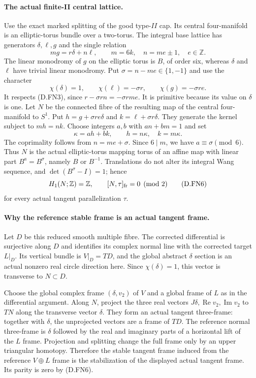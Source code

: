 \paragraph{The actual finite-II central lattice.}
Use the exact marked splitting of the good type-$II$ cap.
Its central four-manifold is an elliptic-torus bundle over a
two-torus.  The integral base lattice has generators
$\delta,\ell,g$ and the single relation
\[
                      m g=r\delta+n\ell,\qquad
                 m=6k,\quad n=me\pm1,\quad e\in\mathbb Z.
 \tag{D.FN3}
\]
The linear monodromy of $g$ on the elliptic torus is $B$, of
order six, whereas $\delta$ and $\ell$ have trivial linear
monodromy.  Put $\sigma=n-me\in\{1,-1\}$ and use the character
\[
 \chi(\delta)=1,\qquad
 \chi(\ell)=-\sigma r,\qquad \chi(g)=-\sigma re.
 \tag{D.FN4}
\]
It respects (D.FN3), since
$r-\sigma rn=-\sigma rme$.  It is primitive because its value
on $\delta$ is one.  Let $N$ be the connected fibre of the
resulting map of the central four-manifold to $S^1$.
Put $h=g+\sigma re\delta$ and $k=\ell+\sigma r\delta$.
They generate the kernel subject to $mh=nk$.  Choose integers
$a,b$ with $an+bm=1$ and set
\[
              \kappa=ah+bk,\qquad h=n\kappa,\quad k=m\kappa.
 \tag{D.FN5}
\]
The coprimality follows from $n=me+\sigma$.  Since $6\mid m$,
we have $a\equiv\sigma\pmod6$.  Thus $N$ is the actual
elliptic-torus mapping torus of an affine map with linear part
$B^a=B^\sigma$, namely $B$ or $B^{-1}$.
Translations do not alter its integral Wang sequence, and
$\det(B^\sigma-I)=1$; hence
\[
                    H_1(N;\mathbb Z)=\mathbb Z,
                    \qquad [N,\tau]_{\rm fr}=0\pmod2
 \tag{D.FN6}
\]
for every actual tangent parallelization $\tau$.

\paragraph{Why the reference stable frame is an actual tangent frame.}
Let $D$ be this reduced smooth multiple fibre.  The corrected
differential is surjective along $D$ and identifies its complex
normal line with the corrected target $L|_D$.  Its vertical
bundle is $V|_D=TD$, and the global abstract $\delta$ section is
an actual nonzero real circle direction here.
Since $\chi(\delta)=1$, this vector is transverse to
$N\subset D$.

Choose the global complex frame $(\delta,v_2)$ of $V$ and a
global frame of $L$ as in the differential argument.  Along
$N$, project the three real vectors
$J\delta,\operatorname{Re}v_2,\operatorname{Im}v_2$ to $TN$
along the transverse vector $\delta$.  They form an actual
tangent three-frame: together with $\delta$, the unprojected
vectors are a frame of $TD$.  The reference normal three-frame
is $\delta$ followed by the real and imaginary parts of a
horizontal lift of the $L$ frame.  Projection and splitting
change the full frame only by an upper triangular homotopy.
Therefore the stable tangent frame induced from the reference
$V\oplus L$ frame is the stabilization of the displayed actual
tangent frame.  Its parity is zero by (D.FN6).

